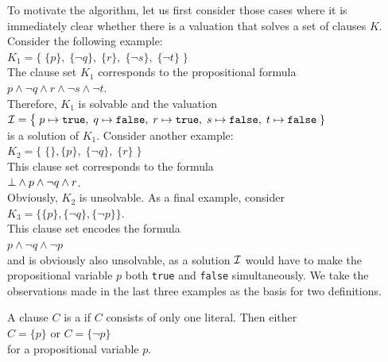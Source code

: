 To motivate the algorithm, let us first consider those cases where
it is immediately clear whether there is a valuation that solves a set of clauses $K$.
Consider the following example: \\[0.2cm]
\hspace*{1.3cm} 
$K_1 = \bigl\{\; \{p\},\; \{\neg q\},\; \{r\},\; \{\neg s\}, \; \{\neg t\} \;\bigr\}$ 
\\[0.2cm]
The clause set $K_1$ corresponds to the propositional formula
\\[0.2cm]
\hspace*{1.3cm}
$p \wedge \neg q \wedge r \wedge \neg s \wedge \neg t$.
\\[0.2cm]
Therefore, $K_1$ is solvable and the valuation  \\[0.2cm]
\hspace*{1.3cm} 
$\mathcal{I} = \bigl\{\; p \mapsto \texttt{true},\; q \mapsto \texttt{false},\; r \mapsto \texttt{true},\; s \mapsto
\texttt{false},\; t \mapsto \texttt{false}\;\}$
\\[0.2cm]
is a solution of $K_1$. Consider another example: \\[0.2cm]
\hspace*{1.3cm} 
$K_2 = \bigl\{\; \{\}, \{p\},\; \{\neg q\},\; \{r\}\; \bigr\}$ 
\\[0.2cm]
This clause set corresponds to the formula
\\[0.2cm]
\hspace*{1.3cm}
$\bot \wedge p \wedge \neg q \wedge r$.
\\[0.2cm]
Obviously, $K_2$ is unsolvable. As a final example, consider
\\[0.2cm]
\hspace*{1.3cm} $K_3 = \bigl\{ \{p\}, \{\neg q\}, \{\neg p\} \bigr\}$.
\\[0.2cm]
This clause set encodes the formula
\\[0.2cm]
\hspace*{1.3cm}
$p \wedge \neg q \wedge \neg p $
\\[0.2cm]
and is obviously also unsolvable, as a solution $\mathcal{I}$ would have to make the propositional variable $p$ both
\texttt{true} and \texttt{false} simultaneously. We take the observations made in the last three examples as the basis for two
definitions.

\begin{Definition}
  A clause $C$ is a  if $C$ consists of only one literal.
  Then either
  \\[0.2cm]
  \hspace*{1.3cm}
  $C = \{p\}$ \quad or \quad $C = \{\neg p\}$ 
  \\[0.2cm]
  for a propositional variable $p$. \eox
\end{Definition}

